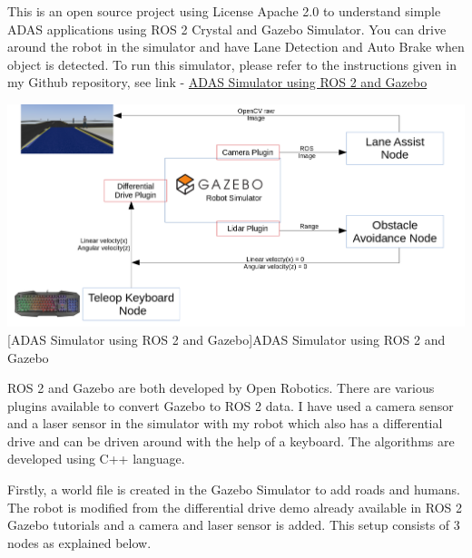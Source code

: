\documentclass[%
xelatex,
	oneside,		%
	12pt,			%
	parskip=half,	%
	abstracton,
	chapterprefix=true%
    appendixprefix=true]
{scrbook}
\begin{document}
\rofoot[\pagemark]{\pagemark}
This is an open source project using License Apache 2.0 to understand simple ADAS applications using ROS 2 Crystal and Gazebo Simulator. You can drive around the robot in the simulator and have Lane Detection and Auto Brake when object is detected. To run this simulator, please refer to the instructions given in my Github repository, see link - \href{https://github.com/Viplav04/ADAS_ROS2-OpenCV-Lane-Detection-Auto-Braking-with-LIDAR-Object-Detection-Gazebo-Teleop-Keyboard}{ADAS Simulator using ROS 2 and Gazebo}\cite{ADASsim}
	\begin{center}
\includegraphics[scale=0.26]{fig/ros2adas.png}
[ADAS Simulator using ROS 2 and Gazebo]{ADAS Simulator using ROS 2 and Gazebo}
\label{fig:ADAS}
\end{center}

ROS 2 and Gazebo are both developed by Open Robotics. There are various plugins available to convert Gazebo to ROS 2 data. I have used a camera sensor and a laser sensor in the simulator with my robot which also has a differential drive and can be driven around with the help of a keyboard. The algorithms are developed using C++ language.

Firstly, a world file is created in the Gazebo Simulator to add roads and humans. The robot is modified from the differential drive demo already available in ROS 2 Gazebo tutorials and a camera and laser sensor is added. This setup consists of 3 nodes as explained below.
\end{document}
